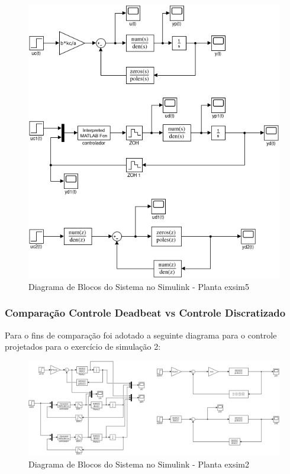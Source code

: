 \documentclass[a4paper,11pt]{article}
\begin{document}
\begin{figure}[H]
    \centering
    \includegraphics[width=0.9\linewidth]{img/exsim5model.png}
    \caption{Diagrama de Blocos do Sistema no Simulink - Planta exsim5}
\end{figure}

\subsubsection{Comparação Controle Deadbeat vs Controle Discratizado}

Para o fins de comparação foi adotado a seguinte diagrama para o controle projetados para o exercício de simulação 2:

\begin{figure}[H]
    \centering
    \includegraphics[width=1\linewidth]{img/exsim2model.png}
    \caption{Diagrama de Blocos do Sistema no Simulink - Planta exsim2}
\end{figure}
\end{document}
